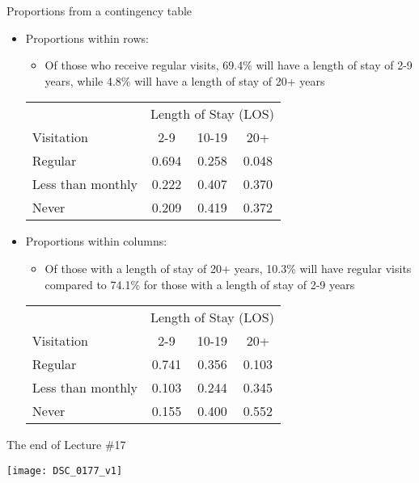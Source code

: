 \documentclass[xcolor=dvipsnames]{beamer}
\begin{document}
\begin{frame}{Proportions from a contingency table}
\begin{itemize}
	\item Proportions within rows:
	\begin{itemize}
		\item Of those who receive regular visits, 69.4\% will have a length of stay of 2-9 years, while 4.8\% will have a length of stay of 20+ years
	\end{itemize}
	{\scriptsize
		\begin{center}
			\begin{tabular}{|l|ccc|}
				\hline
				& \multicolumn{3}{c|}{Length of Stay (LOS)}\\
				Visitation & 2-9 & 10-19 & 20+ \\ \hline
				Regular           & 0.694 & 0.258 & 0.048 \\
				Less than monthly & 0.222 & 0.407 & 0.370 \\
				Never             & 0.209 & 0.419 & 0.372 \\ \hline
			\end{tabular}
	\end{center}} \pause
	\vspace{1mm}
	\item Proportions within columns:
	\begin{itemize}
		\item Of those with a length of stay of 20+ years, 10.3\% will have regular visits compared to 74.1\% for those with a length of stay of 2-9 years 
	\end{itemize}
	{\scriptsize
		\begin{center}
			\begin{tabular}{|l|ccc|}
				\hline
				& \multicolumn{3}{c|}{Length of Stay (LOS)}\\
				Visitation & 2-9 & 10-19 & 20+ \\ \hline
				Regular            &0.741  &0.356  &0.103 \\
				Less than monthly  &0.103  &0.244  &0.345 \\
				Never              &0.155  &0.400  &0.552 \\ \hline
			\end{tabular}
	\end{center}}
\end{itemize}
\end{frame}

\begin{frame}{The end of Lecture \#17}
	\begin{center}
		\texttt{[image: DSC\_0177\_v1]}
	\end{center}
\end{frame}
\end{document}

